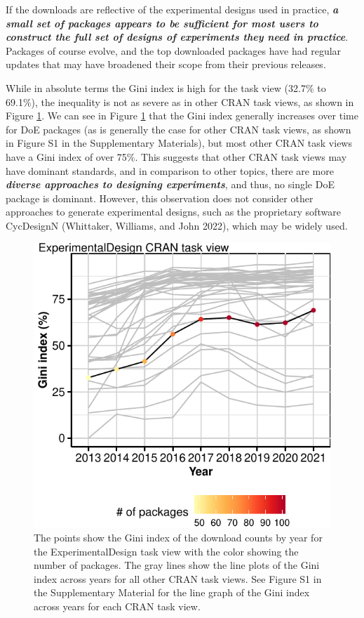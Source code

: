 If the downloads are reflective of the experimental designs used in practice, \textbf{\emph{a small set of packages appears to be sufficient for most users to construct the full set of designs of experiments they need in practice}}. Packages of course evolve, and the top downloaded packages have had regular updates that may have broadened their scope from their previous releases.

While in absolute terms the Gini index is high for the  task view (32.7\% to 69.1\%), the inequality is not as severe as in other CRAN task views, as shown in Figure \ref{fig:fig-gini-all-ctvs}. We can see in Figure \ref{fig:fig-gini-all-ctvs} that the Gini index generally increases over time for DoE packages (as is generally the case for other CRAN task views, as shown in Figure S1 in the Supplementary Materials), but most other CRAN task views have a Gini index of over 75\%. This suggests that other CRAN task views may have dominant standards, and in comparison to other topics, there are more \textbf{\emph{diverse approaches to designing experiments}}, and thus, no single DoE package is dominant. However, this observation does not consider other approaches to generate experimental designs, such as the proprietary software CycDesignN (Whittaker, Williams, and John 2022), which may be widely used.

\begin{figure}[htbp]

{\centering \includegraphics{figures/fig-gini-all-ctvs-1} 

}

\caption{The points show the Gini index of the download counts by year for the ExperimentalDesign task view with the color showing the number of packages. The gray lines show the line plots of the Gini index across years for all other CRAN task views. See Figure S1 in the Supplementary Material for the line graph of the Gini index across years for each CRAN task view.}\label{fig:fig-gini-all-ctvs}
\end{figure}

